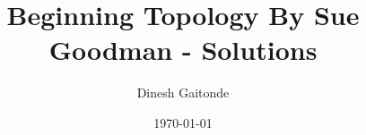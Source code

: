 \documentclass{report}
\begin{document}
\title{Beginning Topology By Sue Goodman - Solutions}
\author{Dinesh Gaitonde}
\date{\today}

\maketitle


\end{document}
